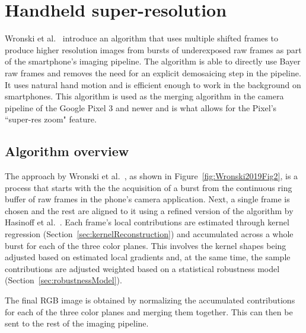\documentclass{sig-alternate}
\begin{document}

\section{Handheld super-resolution}
\label{sec:handheldSuperRes}




Wronski et al.~\cite{Wronski2019} introduce an algorithm that uses multiple shifted frames to produce higher resolution images from bursts of underexposed raw frames as part of the smartphone's imaging pipeline. The algorithm is able to directly use Bayer raw frames and removes the need for an explicit demosaicing step in the pipeline. It uses natural hand motion and is efficient enough to work in the background on smartphones. This algorithm is used as the merging algorithm in the camera pipeline of the Google Pixel 3 and newer and is what allows for the Pixel's ``super-res zoom" feature.

\subsection{Algorithm overview}


The approach by Wronski et al.~\cite{Wronski2019}, as shown in Figure~\ref{fig:Wronski2019Fig2}, is a process that starts with the the acquisition of a burst from the continuous ring buffer of raw frames in the phone's camera application. Next, a single frame is chosen and the rest are aligned to it using a refined version of the algorithm by Hasinoff et al.~\cite{Hasinoff2016}.
Each frame's local contributions are estimated through kernel regression (Section~\ref{sec:kernelReconstruction}) and accumulated across a whole burst for each of the three color planes. This involves the kernel shapes being adjusted based on estimated local gradients and, at the same time, the sample contributions are adjusted weighted based on a statistical robustness model (Section~\ref{sec:robustnessModel}).


The final RGB image is obtained by normalizing the accumulated contributions for each of the three color planes and merging them together. This can then be sent to the rest of the imaging pipeline.
\end{document}
